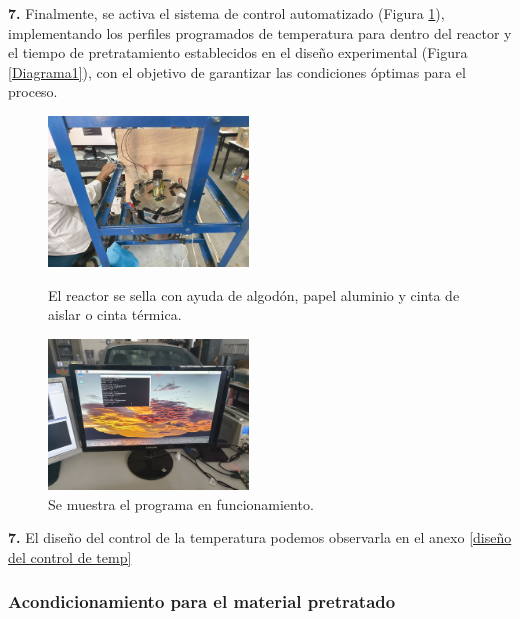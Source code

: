 \documentclass[12pt]{article}
\begin{document}
			\textbf{7.} Finalmente, se activa el sistema de control automatizado (Figura \ref{programa}), implementando los perfiles programados de temperatura para dentro del reactor y el tiempo de pretratamiento establecidos en el diseño experimental (Figura \ref{Diagrama1}), con el objetivo de garantizar las condiciones óptimas para el proceso.
			
			
			\begin{figure}[H]
				\centering
				\begin{minipage}{0.46\textwidth}
					\centering
					\includegraphics[width=\linewidth, height=4cm, keepaspectratio]{imagenes/sellado2}
					\caption{El reactor se sella con ayuda de algodón, papel aluminio y cinta de aislar o cinta térmica.}
					\label{sellado_bio}
				\end{minipage}
				\hfill
				\begin{minipage}{0.48\textwidth}
					\centering
					\includegraphics[width=\linewidth, height=4cm, keepaspectratio]{imagenes/programa3}
					\caption{Se muestra el programa en funcionamiento.}
					\label{programa}
				\end{minipage}
			\end{figure}
			
			\textbf{7.} El diseño del control de la temperatura podemos observarla en el anexo \ref{diseño del control de temp}
			
			
			
			
			\subsubsection{Acondicionamiento para el material pretratado}
			
\end{document}
